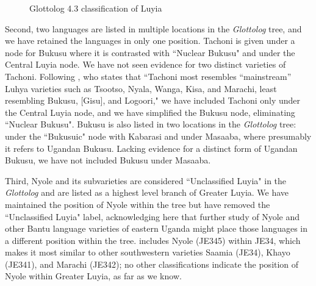 \documentclass[output=paper]{langscibook}
\begin{document}
\begin{figure}
   
  \caption{Glottolog 4.3 classification of Luyia \citep{glottolog}}
  \label{fig:9:Glottolog}
\end{figure}

Second, two languages are listed in multiple locations in the \textit{Glottolog} tree, and we have retained the languages in only one position. Tachoni is given under a node for Bukusu where it is contrasted with ``Nuclear Bukusu" and under the Central Luyia node. We have not seen evidence for two distinct varieties of Tachoni. Following \citet[305]{odden_tachoni_2009}, who states that ``Tachoni most resembles “mainstream” Luhya varieties such as Tsootso, Nyala, Wanga, Kisa, and Marachi, least resembling Bukusu, [Gisu], and Logoori," we have included Tachoni only under the Central Luyia node, and we have simplified the Bukusu node, eliminating ``Nuclear Bukusu". Bukusu is also listed in two locations in the \textit{Glottolog} tree: under the ``Bukusuic" node with Kabarasi and under Masaaba, where presumably it refers to Ugandan Bukusu. Lacking evidence for a distinct form of Ugandan Bukusu, we have not included Bukusu under Masaaba.  

Third, Nyole and its subvarieties are considered ``Unclassified Luyia" in the \textit{Glottolog} and are listed as a highest level branch of Greater Luyia. We have maintained the position of Nyole within the tree but have removed the ``Unclassified Luyia" label, acknowledging here that further study of Nyole and other Bantu language varieties of eastern Uganda might place those languages in a different position within the tree. \citet{maho_nugl_2009} includes Nyole (JE345) within JE34, which makes it most similar to other southwestern varieties Saamia (JE34), Khayo (JE341), and Marachi (JE342); no other classifications indicate the position of Nyole within Greater Luyia, as far as we know.
\end{document}
